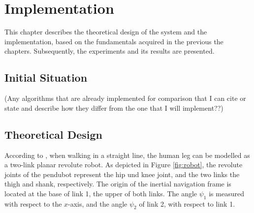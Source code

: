 \chapter{Implementation}
\label{ch:Implementation}

This chapter describes the theoretical design of the system and the implementation, based on the fundamentals acquired in the previous the chapters. Subsequently, the experiments and its results are presented.

\section{Initial Situation}

 (Any algorithms that are already implemented for comparison that I can cite or state and describe how they differ from the one that I will implement??)

\section{Theoretical Design}

According to \citeauthor{bennett_motion_2014} \cite{bennett_motion_2014}, when walking in a straight line, the human leg can be modelled as a two-link planar revolute robot. As depicted in Figure \ref{fig:robot}, the revolute joints of the \gls{pendubot} represent the hip und knee joint, and the two links the thigh and shank, respectively. The origin of the inertial navigation frame is located at the base of link 1, the upper of both links. The angle $\psi_1$ is measured with respect to the $x$-axis, and the angle $\psi_2$ of link 2, with respect to link 1.

